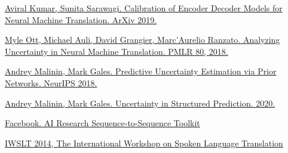 \documentclass[a4paper,14pt]{extarticle}
\begin{document}
\begin{thebibliography}{0}
		\hypertarget{calibration}{}
		\href{https://arxiv.org/pdf/1903.00802v1.pdf}
		{Aviral Kumar, Sunita Sarawagi. Calibration of Encoder Decoder Models for Neural Machine Translation. ArXiv 2019.}
		
		\hypertarget{anal_uncertainty}{}
		\href{https://arxiv.org/pdf/1803.00047.pdf}
		{Myle Ott, Michael Auli, David Grangier, Marc'Aurelio Ranzato. Analyzing Uncertainty in Neural Machine Translation. PMLR 80, 2018.}
		
		\hypertarget{prior}{}
		\href{https://papers.nips.cc/paper/7936-predictive-uncertainty-estimation-via-prior-networks.pdf}
		{Andrey Malinin, Mark Gales. Predictive Uncertainty Estimation via Prior Networks. NeurIPS 2018.}
		
		\hypertarget{uncertainty}{}
		\href{https://arxiv.org/pdf/2002.07650.pdf}
		{Andrey Malinin, Mark Gales. Uncertainty in Structured Prediction. 2020.}
		
		\hypertarget{fairseq}{}
		\href{https://github.com/pytorch/fairseq}
		{Facebook. AI Research Sequence-to-Sequence Toolkit}
		
		\hypertarget{iwslt}{}
		\href{http://workshop2014.iwslt.org/}
		{IWSLT 2014, The International Workshop on Spoken Language Translation}
	\end{thebibliography}
\end{document}
